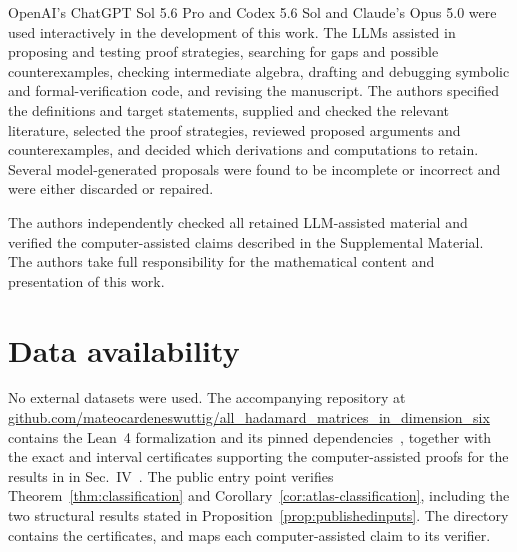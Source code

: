 OpenAI's ChatGPT Sol 5.6 Pro and Codex 5.6 Sol and Claude's Opus 5.0 were used interactively in the development of this work. The LLMs assisted in proposing and testing proof strategies, searching for gaps and possible counterexamples, checking intermediate algebra, drafting and debugging symbolic and formal-verification code, and revising the manuscript. 
%
The authors specified the definitions and target statements, supplied and checked the relevant literature, selected the proof strategies, reviewed proposed arguments and counterexamples, and decided which derivations and computations to retain.
%
Several model-generated proposals were found to be incomplete or incorrect and were either discarded or repaired. 

The authors independently checked all retained LLM-assisted material and verified the computer-assisted claims described in the Supplemental Material. The authors take full responsibility for the mathematical content and presentation of this work.

\section*{Data availability}
No external datasets were used. The accompanying repository at \url{github.com/mateocardeneswuttig/all_hadamard_matrices_in_dimension_six} contains the Lean~4 formalization and its pinned dependencies~\cite{CardenesWuttig2026HadamardRepository}, together with
the exact and interval certificates supporting the computer-assisted proofs for the results in
in Sec.~IV~\cite{CardenesWuttig2026HadamardRepository}. The public entry point  verifies Theorem~\ref{thm:classification} and Corollary~\ref{cor:atlas-classification}, including the two structural results stated in Proposition~\ref{prop:publishedinputs}. The  directory contains the certificates, and  maps each computer-assisted claim to its verifier.


\fi
